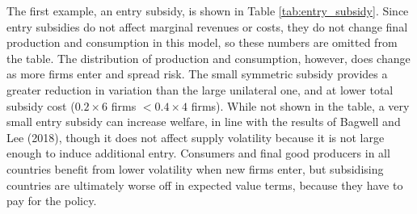 \documentclass{article}
\begin{document}
The first example, an entry subsidy, is shown in Table \ref{tab:entry_subsidy}. Since entry subsidies do not affect marginal revenues or costs, they do not change final production and consumption in this model, so these numbers are omitted from the table. The distribution of production and consumption, however, does change as more firms enter and spread risk. The small symmetric subsidy provides a greater reduction in variation than the large unilateral one, and at lower total subsidy cost ($0.2 \times 6$ firms $< 0.4 \times 4$ firms). While not shown in the table, a very small entry subsidy can increase welfare, in line with the results of Bagwell and Lee (2018), though it does not affect supply volatility because it is not large enough to induce additional entry. Consumers and final good producers in all countries benefit from lower volatility when new firms enter, but subsidising countries are ultimately worse off in expected value terms, because they have to pay for the policy.
\end{document}

